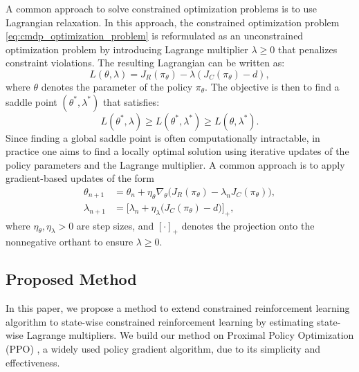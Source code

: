 A common approach to solve constrained optimization problems is to use Lagrangian relaxation.
In this approach, the constrained optimization problem \eqref{eq:cmdp_optimization_problem} is reformulated as an unconstrained optimization problem by introducing Lagrange multiplier $\lambda \geq 0$ that penalizes constraint violations.
The resulting Lagrangian can be written as:
\begin{equation}
    L(\theta, \lambda) = J_R(\pi_\theta) - \lambda (J_C(\pi_\theta) - d),
\end{equation}
where $\theta$ denotes the parameter of the policy $\pi_\theta$.
The objective is then to find a saddle point $(\theta^*, \lambda^*)$ that satisfies:
\begin{equation}
    L(\theta^*, \lambda) \geq L(\theta^*, \lambda^*) \geq L(\theta, \lambda^*).
\end{equation}
Since finding a global saddle point is often computationally intractable, in practice one aims to find a locally optimal solution using iterative updates of the policy parameters and the Lagrange multiplier. 
A common approach is to apply gradient-based updates of the form
\begin{align}
    \theta_{n+1} &= \theta_n + \eta_\theta \nabla_\theta \Big(J_R(\pi_\theta) - \lambda_n J_C(\pi_\theta)\Big), \\
    \lambda_{n+1} &= \Big[\lambda_n + \eta_\lambda \big(J_C(\pi_\theta) - d\big)\Big]_+,
\end{align}
where $\eta_\theta, \eta_\lambda > 0$ are step sizes, and $[\cdot]_+$ denotes the projection onto the nonnegative orthant to ensure $\lambda \geq 0$.



\subsection{Proposed Method}

In this paper, we propose a method to extend constrained reinforcement learning algorithm to state-wise constrained reinforcement learning by estimating state-wise Lagrange multipliers.
We build our method on Proximal Policy Optimization (PPO) \cite{schulman2017proximal}, a widely used policy gradient algorithm, due to its simplicity and effectiveness.